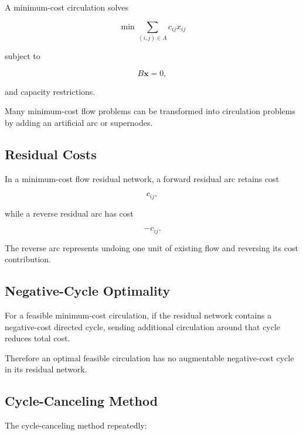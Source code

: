 A minimum-cost circulation solves

\[
\boxed{
\min
\sum_{(i,j)\in A}
c_{ij}x_{ij}
}
\]

subject to

\[
\boxed{
B\mathbf{x}=0,
}
\]

and capacity restrictions.

Many minimum-cost flow problems can be transformed into circulation
problems by adding an artificial arc or supernodes.

\subsection{Residual Costs}
\label{subsec:residual-costs}

In a minimum-cost flow residual network, a forward residual arc retains
cost

\[
\boxed{
c_{ij},
}
\]

while a reverse residual arc has cost

\[
\boxed{
-c_{ij}.
}
\]

The reverse arc represents undoing one unit of existing flow and reversing
its cost contribution.

\subsection{Negative-Cycle Optimality}
\label{subsec:negative-cycle-optimality}

For a feasible minimum-cost circulation, if the residual network contains
a negative-cost directed cycle, sending additional circulation around that
cycle reduces total cost.

Therefore an optimal feasible circulation has no augmentable negative-cost
cycle in its residual network.

\subsection{Cycle-Canceling Method}
\label{subsec:cycle-canceling}

The cycle-canceling method repeatedly:

